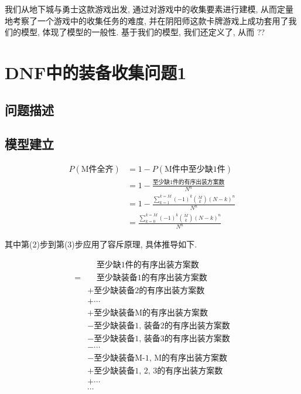 \documentclass[10pt,journal,compsoc]{IEEEtran}
\begin{document}
  我们从地下城与勇士这款游戏出发, 通过对游戏中的收集要素进行建模, 从而定量地考察了一个游戏中的收集任务的难度, 并在阴阳师这款卡牌游戏上成功套用了我们的模型, 体现了模型的一般性. 基于我们的模型, 我们还定义了, 从而 ??

\section{DNF中的装备收集问题1}

\subsection{问题描述}

\subsection{模型建立}

  \begin{align}
    P(\text{M件全齐}) &= 1-P(\text{M件中至少缺1件})\\
    &= 1-\frac{\text{至少缺1件的有序出装方案数}}{N^n}\\
    &= 1-\frac{\sum_{k=1}^{k=M}(-1)^k\binom{M}{k}(N-k)^n}{N^n}\\
    &= \frac{\sum_{k=0}^{k=M}(-1)^k\binom{M}{k}(N-k)^n}{N^n}
  \end{align}
  
  其中第(2)步到第(3)步应用了容斥原理, 具体推导如下.
  
  \begin{equation*}
    \begin{split}
      &~~~~~\text{至少缺1件的有序出装方案数} \\
      =&~~~~~\text{至少缺装备1的有序出装方案数} \\
      &+ \text{至少缺装备2的有序出装方案数} \\
      &+ \cdots \\
      &+ \text{至少缺装备M的有序出装方案数} \\
      &- \text{至少缺装备1, 装备2的有序出装方案数} \\
      &- \text{至少缺装备1, 装备3的有序出装方案数} \\
      &- \cdots \\
      &- \text{至少缺装备M-1, M的有序出装方案数} \\
      &+ \text{至少缺装备1, 2, 3的有序出装方案数} \\
      &+ \cdots \\
      &\cdots
    \end{split}
  \end{equation*}
\end{document}

